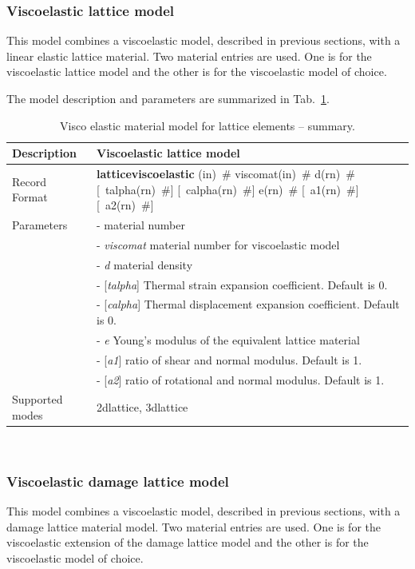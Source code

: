 \documentclass[a4paper]{article}
\newcommand{\descitem}[1]{{\noindent \bf #1}}
\newcommand{\elemparam}[2]{{{#1\tiny (#2)}~\#}}
\newcommand{\optelemparam}[2]{[{~\elemparam{#1}{#2}}]}
\newcommand{\param}[1]{{\it #1}}
\newcommand{\optparam}[1]{[{\it #1}]}
\newenvironment{mmt}{\begin{tabular}{|l|p{9cm}|}}{\end{tabular}\\}
\newenvironment{mmt}{\begin{tabular}{|l|l|}}{\end{tabular}\\}
\begin{document}
\subsubsection{Viscoelastic lattice model}

This model combines a viscoelastic model, described in previous sections, with a linear elastic lattice material. Two material entries are used. One is for the viscoelastic lattice model and the other is for the viscoelastic model of choice. 

The model description and parameters are summarized in Tab.~\ref{latticeviscoelastic_table}.

\begin{table}[!htb]
\begin{mmt}
\hline
Description & Viscoelastic lattice model\\
\hline
Record Format & \descitem{latticeviscoelastic} \elemparam{}{in}
\elemparam{viscomat}{in} \elemparam{d}{rn} \optelemparam{talpha}{rn} \optelemparam{calpha}{rn} \elemparam{e}{rn} \optelemparam{a1}{rn} \optelemparam{a2}{rn}\\
Parameters &- \param{} material number\\
&- \param{viscomat} material number for viscoelastic model\\
&- \param{d} material density\\
&- \optparam{talpha} Thermal strain expansion coefficient. Default is 0.\\
&- \optparam{calpha} Thermal displacement expansion coefficient. Default is 0.\\
&- \param{e} Young's modulus of the equivalent lattice material\\
&- \optparam{a1} ratio of shear and normal modulus. Default is 1.\\
&- \optparam{a2} ratio of rotational and normal modulus. Default is 1.\\
Supported modes & 2dlattice, 3dlattice\\
\hline
\end{mmt}
\caption{Visco elastic material model for lattice elements -- summary.}
\label{latticeviscoelastic_table}
\end{table}


\subsubsection{Viscoelastic damage lattice model}

This model combines a viscoelastic model, described in previous sections, with a damage lattice material model. Two material entries are used. One is for the viscoelastic extension of the damage lattice model and the other is for the viscoelastic model of choice. 
\end{document}
